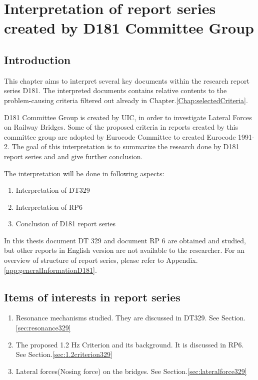 \chapter{Interpretation of report series created by D181 Committee Group}\label{sec:D181reportseries}


\section{Introduction}

This chapter aims to interpret several key documents within the research report series D181. The interpreted documents contains relative contents to the problem-causing criteria filtered out already in Chapter.\ref{Chap:selectedCriteria}.

D181 Committee Group is created by UIC, in order to investigate Lateral Forces on Railway Bridges. Some of the proposed criteria in reports created by this committee group are adopted by Eurocode Committee to created Eurocode 1991-2. The goal of this interpretation is to summarize the research done by D181 report series and and give further conclusion.

The interpretation will be done in following aspects:

\begin{enumerate}
    \item Interpretation of DT329
    \item Interpretation of RP6
    \item Conclusion of D181 report series
\end{enumerate}

In this thesis document DT 329 and document RP 6 are obtained and studied, but other reports in English version are not available to the researcher.
For an overview of structure of report series, please refer to Appendix.\ref{app:generalInformationD181}.

\section{Items of interests in report series}

\begin{enumerate}
    \item Resonance mechanisms studied. They are discussed in DT329. See Section.\ref{sec:resonance329}
    \item The proposed 1.2 Hz Criterion and its background. It is discussed in RP6. See Section.\ref{sec:1.2criterion329}
    \item  Lateral forces(Nosing force) on the bridges. See Section.\ref{sec:lateralforce329}
\end{enumerate}


